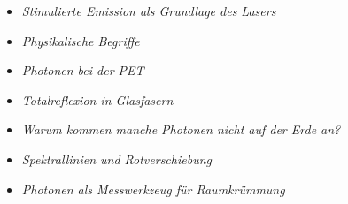 \begin{tcolorbox}[title=physikalische Boxen, physikbox]
	\begin{itemize}
		\item \emph{Stimulierte Emission als Grundlage des Lasers} \dotfill\pageref{box:grundlagedeslaser}
		\item \emph{Physikalische Begriffe} \dotfill\pageref{box:begriffe}
		\item \emph{Photonen bei der PET} \dotfill\pageref{box:PET}
		\item \emph{Totalreflexion in Glasfasern} \dotfill\pageref{box:glasfaser}
		\item \emph{Warum kommen manche Photonen \newline nicht auf der Erde an?} \dotfill\pageref{box:photonen auf erde}
		\item \emph{Spektrallinien und Rotverschiebung} \dotfill\pageref{box:spektrallinien}
		\item \emph{Photonen als Messwerkzeug für Raumkrümmung}\dotfill\pageref{box:messwerkzeug}
	\end{itemize}
\end{tcolorbox}




